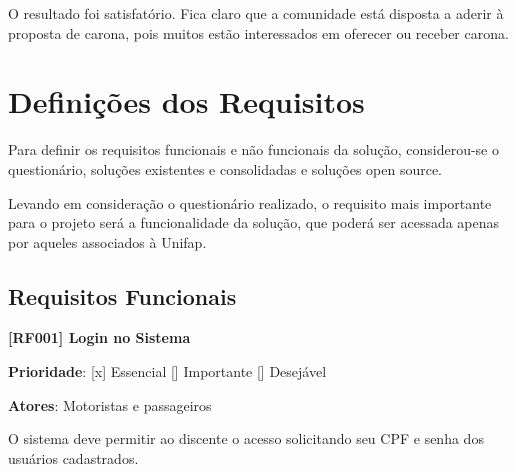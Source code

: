 O resultado foi satisfatório. Fica claro que a comunidade está disposta a aderir à proposta de carona, pois muitos estão interessados em oferecer ou receber carona.

\section{Definições dos Requisitos}

Para definir os requisitos funcionais e não funcionais da solução, considerou-se o questionário, soluções existentes e consolidadas e soluções open source.

Levando em consideração o questionário realizado, o requisito mais importante para o projeto será a funcionalidade da solução, que poderá ser acessada apenas por aqueles associados à Unifap.







\subsection{Requisitos Funcionais}
\textbf{[RF001] Login no Sistema}

\textbf{Prioridade}:      [x] Essencial        [] Importante     [] Desejável 

\textbf{Atores}: Motoristas e passageiros


O sistema deve permitir ao discente o acesso solicitando seu CPF e senha dos usuários cadastrados.




